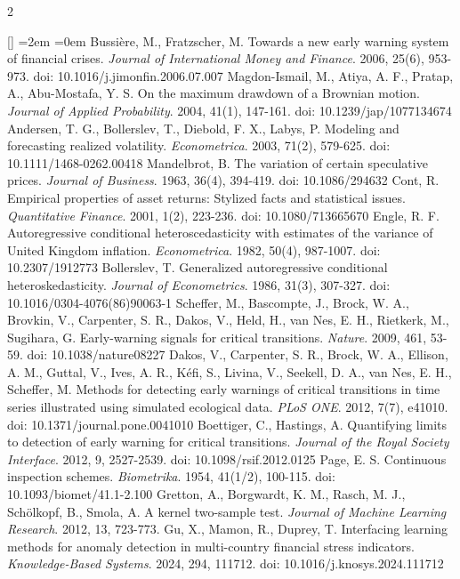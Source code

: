 \documentclass{book}
\begin{document}
\begin{multicols}{2}
\begin{list}{[]}{ %
\leftmargin=2em%
=0em%
\renewcommand{\makelabel}[1]{#1 \hfil}}
 Bussi{\`e}re, M., Fratzscher, M. Towards a new early warning system of financial crises. {\it Journal of International Money and Finance}. 2006, 25(6), 953-973. doi: 10.1016/j.jimonfin.2006.07.007
 Magdon-Ismail, M., Atiya, A. F., Pratap, A., Abu-Mostafa, Y. S. On the maximum drawdown of a Brownian motion. {\it Journal of Applied Probability}. 2004, 41(1), 147-161. doi: 10.1239/jap/1077134674
 Andersen, T. G., Bollerslev, T., Diebold, F. X., Labys, P. Modeling and forecasting realized volatility. {\it Econometrica}. 2003, 71(2), 579-625. doi: 10.1111/1468-0262.00418
 Mandelbrot, B. The variation of certain speculative prices. {\it Journal of Business}. 1963, 36(4), 394-419. doi: 10.1086/294632
 Cont, R. Empirical properties of asset returns: Stylized facts and statistical issues. {\it Quantitative Finance}. 2001, 1(2), 223-236. doi: 10.1080/713665670
 Engle, R. F. Autoregressive conditional heteroscedasticity with estimates of the variance of United Kingdom inflation. {\it Econometrica}. 1982, 50(4), 987-1007. doi: 10.2307/1912773
 Bollerslev, T. Generalized autoregressive conditional heteroskedasticity. {\it Journal of Econometrics}. 1986, 31(3), 307-327. doi: 10.1016/0304-4076(86)90063-1
 Scheffer, M., Bascompte, J., Brock, W. A., Brovkin, V., Carpenter, S. R., Dakos, V., Held, H., van Nes, E. H., Rietkerk, M., Sugihara, G. Early-warning signals for critical transitions. {\it Nature}. 2009, 461, 53-59. doi: 10.1038/nature08227
 Dakos, V., Carpenter, S. R., Brock, W. A., Ellison, A. M., Guttal, V., Ives, A. R., K{\'e}fi, S., Livina, V., Seekell, D. A., van Nes, E. H., Scheffer, M. Methods for detecting early warnings of critical transitions in time series illustrated using simulated ecological data. {\it PLoS ONE}. 2012, 7(7), e41010. doi: 10.1371/journal.pone.0041010
 Boettiger, C., Hastings, A. Quantifying limits to detection of early warning for critical transitions. {\it Journal of the Royal Society Interface}. 2012, 9, 2527-2539. doi: 10.1098/rsif.2012.0125
 Page, E. S. Continuous inspection schemes. {\it Biometrika}. 1954, 41(1/2), 100-115. doi: 10.1093/biomet/41.1-2.100
 Gretton, A., Borgwardt, K. M., Rasch, M. J., Sch{\"o}lkopf, B., Smola, A. A kernel two-sample test. {\it Journal of Machine Learning Research}. 2012, 13, 723-773.
 Gu, X., Mamon, R., Duprey, T. Interfacing learning methods for anomaly detection in multi-country financial stress indicators. {\it Knowledge-Based Systems}. 2024, 294, 111712. doi: 10.1016/j.knosys.2024.111712

\end{list}
\end{multicols}
\end{document}
